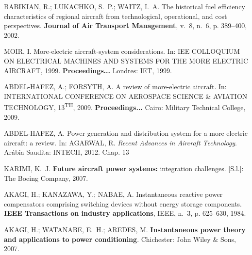 \providecommand{\abntreprintinfo}[1]{%
 \citeonline{#1}}
\begin{thebibliography}{}
	\providecommand{\abntrefinfo}[3]{}
	\providecommand{\abntbstabout}[1]{}
	\abntbstabout{1.42.2.1 }

\abntrefinfo{Babikian, Lukachko e Waitz}{BABIKIAN; LUKACHKO; WAITZ}{2002}
{BABIKIAN, R.; LUKACHKO, S.~P.; WAITZ, I.~A. The historical fuel efficiency
  characteristics of regional aircraft from technological, operational, and
  cost perspectives.
\textbf{Journal of Air Transport Management}, v.~8, n.~6, p. 389--400,
  2002.}

\abntrefinfo{Moir}{MOIR}{1999}
{MOIR, I. More-electric aircraft-system considerations. In:  \uppercase{IEE
  Colloquium on Electrical Machines and Systems for the More Electric
  Aircraft}, 1999. \textbf{Proceedings...} Londres: IET, 1999.}

\abntrefinfo{Abdel-Hafez e Forsyth}{ABDEL-HAFEZ; FORSYTH}{2009}
{ABDEL-HAFEZ, A.; FORSYTH, A. A review of more-electric aircraft. In:
  \uppercase{International Conference on Aerospace Science \& Aviation
  Technology, 13\textsuperscript{\lowercase{th}}}, 2009. \textbf{Proceedings...} Cairo: Military Technical College, 2009.}

\abntrefinfo{Abdel-Hafez}{ABDEL-HAFEZ}{2012}
{ABDEL-HAFEZ, A. Power generation and distribution system for a
	more electric aircraft: a review. In: AGARWAL, R. \textit{Recent Advances in Aircraft Technology}.
	Ar\'abia Saudita: INTECH, 2012. Chap. 13}

\abntrefinfo{Karimi}{KARIMI}{2007}
{KARIMI, K.~J. \textbf{Future aircraft power systems:} integration challenges. [S.l.]: The Boeing Company, 2007.}

\abntrefinfo{Akagi, Kanazawa e Nabae}{AKAGI; KANAZAWA; NABAE}{1984}
{AKAGI, H.; KANAZAWA, Y.; NABAE, A. Instantaneous reactive power 
  compensators comprising switching devices without energy storage components.
  \textbf{IEEE Transactions on industry applications}, IEEE, n.~3, p. 625--630,
  1984.}

\abntrefinfo{Akagi, Watanabe e Aredes}{AKAGI; WATANABE; AREDES}{2007}
{AKAGI, H.; WATANABE, E.~H.; AREDES, M. \textbf{Instantaneous power theory and
  applications to power conditioning}. Chichester: John Wiley \& Sons, 2007.}


\end{thebibliography}
